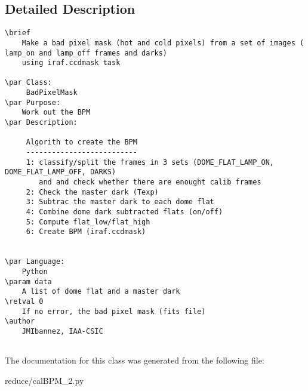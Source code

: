 \subsection{Detailed Description}


\footnotesize\begin{verbatim}
\brief
    Make a bad pixel mask (hot and cold pixels) from a set of images ( lamp_on and lamp_off frames and darks)
    using iraf.ccdmask task 
        
\par Class:
     BadPixelMask   
\par Purpose:
    Work out the BPM
\par Description:
     
     Algorith to create the BPM
     -------------------------- 
     1: classify/split the frames in 3 sets (DOME_FLAT_LAMP_ON, DOME_FLAT_LAMP_OFF, DARKS)
        and and check whether there are enought calib frames
     2: Check the master dark (Texp)
     3: Subtrac the master dark to each dome flat
     4: Combine dome dark subtracted flats (on/off)
     5: Compute flat_low/flat_high
     6: Create BPM (iraf.ccdmask)

        
\par Language:
    Python
\param data
    A list of dome flat and a master dark
\retval 0
    If no error, the bad pixel mask (fits file)
\author
    JMIbannez, IAA-CSIC
    
\end{verbatim}
\normalsize
 



The documentation for this class was generated from the following file:\begin{CompactItemize}
\item 
reduce/cal\-BPM\_\-2.py\end{CompactItemize}
